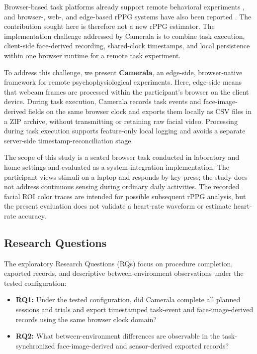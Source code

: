 \documentclass[dvipdfmx]{ehis}
\begin{document}
Browser-based task platforms already support remote behavioral experiments \cite{jspsych_joss,psychopy2}, and browser-, web-, and edge-based rPPG systems have also been reported \cite{ayesha_web_vital,labvanced_rppg,facephys_demo,rhythmedge}.
The contribution sought here is therefore not a new rPPG estimator.
The implementation challenge addressed by Camerala is to combine task execution, client-side face-derived recording, shared-clock timestamps, and local persistence within one browser runtime for a remote task experiment.

To address this challenge, we present \textbf{Camerala}, an edge-side, browser-native framework for remote psychophysiological experiments.
Here, edge-side means that webcam frames are processed within the participant's browser on the client device.
During task execution, Camerala records task events and face-image-derived fields on the same browser clock and exports them locally as CSV files in a ZIP archive, without transmitting or retaining raw facial video.
Processing during task execution supports feature-only local logging and avoids a separate server-side timestamp-reconciliation stage.

The scope of this study is a seated browser task conducted in laboratory and home settings and evaluated as a system-integration implementation.
The participant views stimuli on a laptop and responds by key press; the study does not address continuous sensing during ordinary daily activities.
The recorded facial ROI color traces are intended for possible subsequent rPPG analysis, but the present evaluation does not validate a heart-rate waveform or estimate heart-rate accuracy.

\subsection{Research Questions}
The exploratory Research Questions (RQs) focus on procedure completion, exported records, and descriptive between-environment observations under the tested configuration:
\begin{itemize}
    \item \textbf{RQ1:} Under the tested configuration, did Camerala complete all planned sessions and trials and export timestamped task-event and face-image-derived records using the same browser clock domain?
    \item \textbf{RQ2:} What between-environment differences are observable in the task-synchronized face-image-derived and sensor-derived exported records?
\end{itemize}
\end{document}
